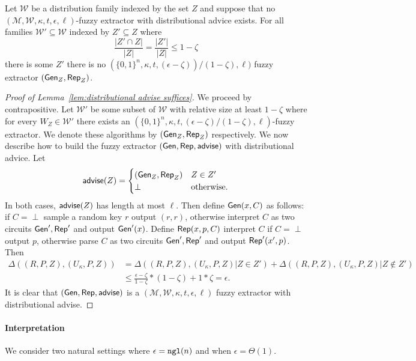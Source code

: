 \begin{lemma}

Let $\mathcal{W}$ be a distribution family indexed by the set $Z$ and suppose that no $(\mathcal{M}, \mathcal{W}, \kappa, t, \epsilon, \ell)$-fuzzy extractor with distributional advice exists.  For all families $\mathcal{W}'\subseteq \mathcal{W}$ indexed by $Z'\subseteq Z$ where \[\frac{|Z'\cap Z|}{|Z|} = \frac{|Z'|}{|Z|}\le 1-\zeta\] there is some $Z'$ there is no  $(\{0,1\}^n,\kappa, t, (\epsilon-\zeta))/(1-\zeta), \ell)$ fuzzy extractor $({\mathsf{Gen}}_Z, {\mathsf{Rep}}_Z)$.
\label{lem:distributional advise suffices}
\end{lemma}
\begin{proof}[Proof of Lemma~\ref{lem:distributional advise suffices}]
We proceed by contrapositive.  Let $\mathcal{W}'$ be some subset of $\mathcal{W}$ with relative size at least $1-\zeta$ where  for every $W_Z\in\mathcal{W}'$ there exists an $(\{0,1\}^n,\kappa, t, (\epsilon-\zeta)/(1-\zeta), \ell)$-fuzzy extractor.  We denote these algorithms by $({\mathsf{Gen}}_Z, {\mathsf{Rep}}_Z)$ respectively.  We now describe how to build the fuzzy extractor $({\mathsf{Gen}}, {\mathsf{Rep}}, {\mathsf{advise}})$ with distributional advice.  Let 
\[
{\mathsf{advise}}(Z) = \begin{cases} ({\mathsf{Gen}}_Z, {\mathsf{Rep}}_Z)& Z\in Z'\\\perp&\text{otherwise.}\end{cases}
\]
In both cases, ${\mathsf{advise}}(Z)$ has length at most $\ell$. Then define ${\mathsf{Gen}}(x, C)$ as follows:  if $C = \perp$ sample a random key $r$ output $(r, r)$, otherwise interpret $C$ as two circuits ${\mathsf{Gen}}', {\mathsf{Rep}}'$ and output ${\mathsf{Gen}}'(x)$.  Define ${\mathsf{Rep}}(x, p, C)$ interpret $C$ if $C = \perp$ output $p$, otherwise parse $C$ as two circuits ${\mathsf{Gen}}', {\mathsf{Rep}}'$ and output ${\mathsf{Rep}}'(x', p)$.  
Then 
\begin{align*}
\Delta((R, P, Z), (U_\kappa, P, Z)) &= \Delta((R, P, Z), (U_\kappa, P, Z) | Z\in Z')+\Delta((R, P, Z), (U_\kappa, P, Z) | Z\not\in Z')\\
&\le \frac{\epsilon-\zeta}{1-\zeta} * (1-\zeta) + 1* \zeta = \epsilon.
\end{align*}
It is clear that $({\mathsf{Gen}}, {\mathsf{Rep}}, {\mathsf{advise}})$ is a $(\mathcal{M}, \mathcal{W}, \kappa, t, \epsilon, \ell)$ fuzzy extractor with distributional advise.
\end{proof}

\paragraph{Interpretation} 
We consider two natural settings where $\epsilon = \mathtt{ngl}(n)$ and when $\epsilon = \Theta(1)$.

